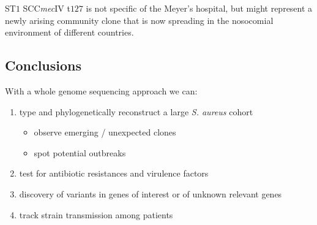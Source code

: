 ST$1$ SCC\emph{mec}IV t$127$ is not specific of the Meyer's hospital, but might represent a newly arising community clone that is now spreading in the nosocomial environment of different countries. 

\subsection{Conclusions}

With a whole genome sequencing approach we can:

\begin{enumerate}
    \item type and phylogenetically reconstruct a large \emph{S. aureus} cohort
    \begin{itemize}
        \item observe emerging / unexpected clones
        \item spot potential outbreaks
    \end{itemize}
    \item test for antibiotic resistances and virulence factors
    \item discovery of variants in genes of interest or of unknown relevant genes
    \item track strain transmission among patients
\end{enumerate}
